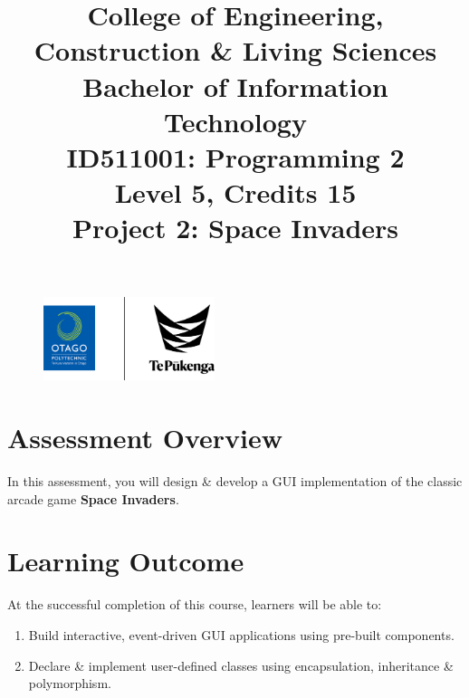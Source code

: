 \documentclass{article}
\author{}
\begin{document}
\begin{figure}
    \centering
    \includegraphics[width=50mm]{../../resources/img/logo.png}
\end{figure}

\title{College of Engineering, Construction \& Living Sciences\\Bachelor of Information Technology\\ID511001: Programming 2\\Level 5, Credits 15\\\textbf{Project 2: Space Invaders}}
\date{}
\maketitle

\section*{Assessment Overview}
In this assessment, you will design \& develop a GUI implementation of the classic arcade game \textbf{Space Invaders}.

\section*{Learning Outcome}
At the successful completion of this course, learners will be able to:
\begin{enumerate}
    \item Build interactive, event-driven GUI applications using pre-built components.
    \item Declare \& implement user-defined classes using encapsulation, inheritance \& polymorphism.
\end{enumerate}
\end{document}
